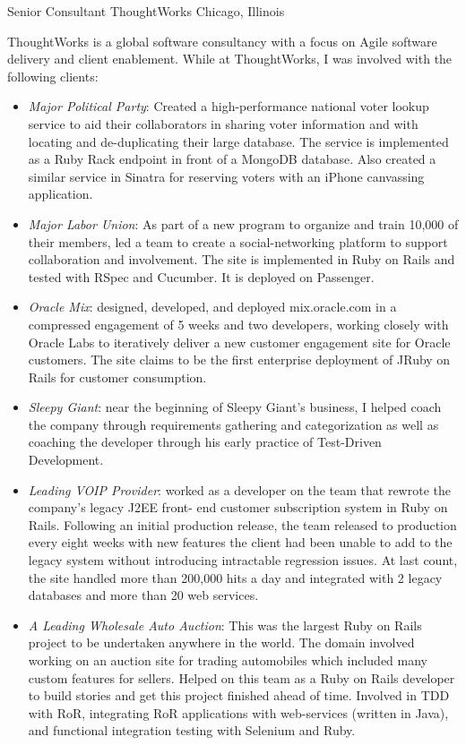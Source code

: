 \documentclass[11pt,letterpaper]{moderncv}
\begin{document}
 {Senior Consultant} {ThoughtWorks} {Chicago, Illinois} {} {%
  ThoughtWorks is a global software consultancy with a focus on Agile software
  delivery and client enablement. While at ThoughtWorks, I was involved with
  the following clients:
  \begin{itemize}
  \item \emph{Major Political Party}: Created a high-performance national
    voter lookup service to aid their collaborators in sharing voter
    information and with locating and de-duplicating their large
    database. The service is implemented as a Ruby Rack endpoint in
    front of a MongoDB database. Also created a similar service in
    Sinatra for reserving voters with an iPhone canvassing application.
  \item \emph{Major Labor Union}: As part of a new program to organize
    and train 10,000 of their members, led a team to create a
    social-networking platform to support collaboration and involvement.
    The site is implemented in Ruby on Rails and tested with RSpec and
    Cucumber. It is deployed on Passenger.
  \item \emph{Oracle Mix}: designed, developed, and deployed
    mix.oracle.com in a compressed engagement of 5 weeks and two
    developers, working closely with Oracle Labs to iteratively deliver
    a new customer engagement site for Oracle customers. The site claims
    to be the first enterprise deployment of JRuby on Rails for customer
    consumption.
  \item \emph{Sleepy Giant}: near the beginning of Sleepy Giant's
    business, I helped coach the company through requirements gathering
    and categorization as well as coaching the developer through his
    early practice of Test-Driven Development.
  \item \emph{Leading VOIP Provider}: worked as a developer on the team
    that rewrote the company's legacy J2EE front- end customer
    subscription system in Ruby on Rails. Following an initial
    production release, the team released to production every eight
    weeks with new features the client had been unable to add to the
    legacy system without introducing intractable regression issues. At
    last count, the site handled more than 200,000 hits a day and
    integrated with 2 legacy databases and more than 20 web services.
  \item \emph{A Leading Wholesale Auto Auction}: This was the largest
    Ruby on Rails project to be undertaken anywhere in the world. The
    domain involved working on an auction site for trading automobiles
    which included many custom features for sellers. Helped on this team
    as a Ruby on Rails developer to build stories and get this project
    finished ahead of time. Involved in TDD with RoR, integrating RoR
    applications with web-services (written in Java), and functional
    integration testing with Selenium and Ruby.
  \end{itemize}
}
\end{document}
